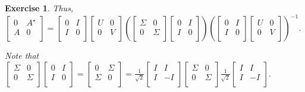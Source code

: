 \documentclass[paper=a4, fontsize=11pt]{scrartcl} %
\numberwithin{equation}{section} %
\numberwithin{figure}{section} %
\numberwithin{table}{section} %
\newtheorem{exercise}{Exercise}
\numberwithin{exercise}{section}
\begin{document}
\begin{exercise}
Thus,
$\begin{bmatrix}
0 & A^{\star} \\
A & 0 \\
\end{bmatrix} =
\begin{bmatrix}
0 & I \\
I & 0 \\
\end{bmatrix} 
\begin{bmatrix}
U  & 0 \\
 0 & V \\
\end{bmatrix}\left(\begin{bmatrix}
\Sigma & 0 \\
0 & \Sigma \\
\end{bmatrix}
\begin{bmatrix}
0 & I \\
I & 0 \\
\end{bmatrix} \right) \left(\begin{bmatrix}
0 & I \\
I & 0 \\
\end{bmatrix} \begin{bmatrix}
U  & 0 \\
 0 & V \\
\end{bmatrix}\right)^{-1}.$

Note that $\begin{bmatrix}
\Sigma & 0 \\
0 & \Sigma \\
\end{bmatrix}
\begin{bmatrix}
0 & I \\
I & 0 \\
\end{bmatrix}=\begin{bmatrix}
0 & \Sigma \\
\Sigma & 0\\
\end{bmatrix}=\frac{1}{\sqrt{2}} \begin{bmatrix}
I   & I \\
I & -I \\
\end{bmatrix} \begin{bmatrix}
\Sigma  & 0 \\
0&  \Sigma \\ 
\end{bmatrix} \frac{1}{\sqrt{2}} \begin{bmatrix}
I   & I \\
I & -I \\
\end{bmatrix}.$


\end{exercise}
\end{document}
